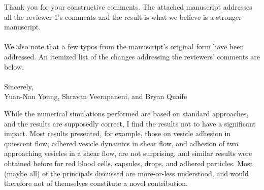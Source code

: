 \documentclass[11pt]{article}
\newcommand{\comment}[1]{{\color{blue} #1}}
\begin{document}
\noindent
Thank you for your constructive comments.  The attached manuscript
addresses all the reviewer 1's comments and the result is what we
believe is a stronger manuscript.
\\ \\ \noindent 
We also note that a few typos from the manuscript’s original form have
been addressed. An itemized list of the changes addressing the
reviewers’ comments are below.
\\ \\ \noindent 
Sincerely, \\ \noindent
Yuan-Nan Young, Shravan Veerapaneni, and Bryan Quaife

\vspace{20pt}
\noindent
\comment{While the numerical simulations performed are based on standard
approaches, and the results are supposedly correct, I find the results
not to have a significant impact. Most results presented, for example,
those on vesicle adhesion in quiescent flow, adhered vesicle dynamics in
shear flow, and adhesion of two approaching vesicles in a shear flow,
are not surprising, and similar results were obtained before for red
blood cells, capsules, drops, and adhered particles. Most (maybe all) of
the principals discussed are more-or-less understood, and would
therefore not of themselves constitute a novel contribution.}
\end{document}
